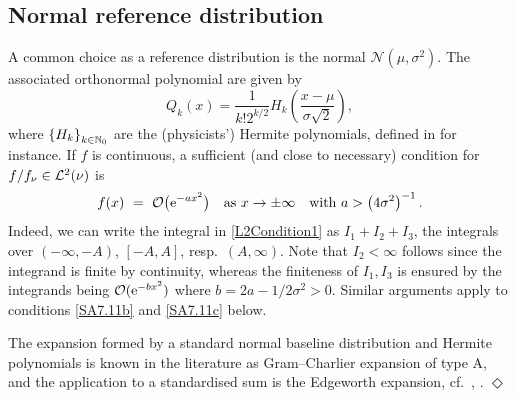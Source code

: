 \subsection{Normal reference distribution}\label{SS:NormalNu}
A common choice as a reference distribution is the normal $\mathcal{N}(\mu,\sigma^{2})$. The associated orthonormal polynomial are given by
\begin{equation}\label{eq:NormalDistributionOrthogonalPolynomial}
Q_{k}(x)=\frac{1}{k!2^{k/2}}H_{k}\left(\frac{x-\mu}{\sigma\sqrt{2}}\right),
\end{equation}
where $\left\{H_{k}\right\}_{k\in\mathbb{N}_0}$ are the (physicists') Hermite polynomials, defined in \cite{Szegoe1939} for instance.
If $f$ is continuous, a sufficient (and close to necessary) condition for $f/f_\nu\in\mathcal{L}^2(\nu)$ is
\begin{equation}\label{SA7.11a}
f(x)\ =\ {\mathcal{O}}\big(\mathrm{e}^{-ax^2}\big)\quad\text{as }x\to\pm\infty\quad\text{with } a>\big(4\sigma^2\big)^{-1}\,.
\end{equation}
Indeed, we can  write the integral in \eqref{L2Condition1} as $I_1+I_2+I_3$, the integrals over
$(-\infty,-A)$, $[-A,A]$, resp.\ $(A,\infty)$. Note that $I_2<\infty$  follows since the integrand
is finite by continuity, whereas the finiteness of $I_1,I_3$ is ensured by the integrands
being ${\mathcal{O}}(\mathrm{e}^{-bx^2})$ where $b=2a-1/2\sigma^2>0$. Similar arguments apply to
conditions \eqref{SA7.11b} and \eqref{SA7.11c} below.
\begin{remark}
The expansion formed by a standard normal baseline distribution and Hermite polynomials is known in the literature as Gram--Charlier expansion of type A, and the application to a standardised sum is the Edgeworth expansion, cf.\ \cite{Cr99}, \cite{Barndorff1989asymptotic}. \hfill $\Diamond$
\end{remark}
%

